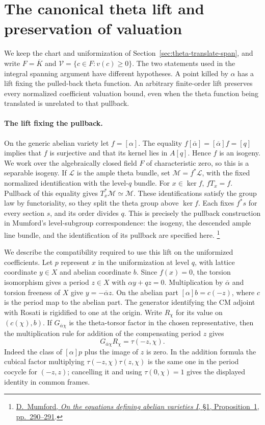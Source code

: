 \section{The canonical theta lift and preservation of valuation}
\label{sec:theta-lift-valuation}

We keep the chart and uniformization of
Section~\ref{sec:theta-translate-span}, and write \(F=\overline K\)
and \(\mathcal V=\{c\in F:v(c)\ge0\}\). The two statements used in the
integral spanning argument have different hypotheses. A point killed
by \(\alpha\) has a lift fixing the pulled-back theta function.
An arbitrary finite-order lift preserves every normalized coefficient
valuation bound, even when the theta function being translated is
unrelated to that pullback.

\paragraph{The lift fixing the pullback.}
On the generic abelian variety let \(f=[\alpha]\). The equality
\(f[\overline\alpha]=[\overline\alpha]f=[q]\) implies that \(f\) is
surjective and that its kernel lies in \(A[q]\). Hence \(f\) is an
isogeny. We work over the algebraically closed field \(F\) of
characteristic zero, so this is a separable isogeny.
If \(\mathcal L\) is the ample theta bundle, set
\(\mathcal M=f^*\mathcal L\), with the fixed normalized identification
with the level-\(q\) bundle. For \(x\in\ker f\), \(fT_x=f\).
Pullback of this equality gives
\(T_x^*\mathcal M\simeq\mathcal M\). These identifications satisfy the
group law by functoriality, so they split the theta group above
\(\ker f\). Each fixes \(f^*s\) for every section \(s\), and its order
divides \(q\). This is precisely the pullback construction in Mumford's
level-subgroup correspondence: the isogeny, the descended ample
line bundle, and the identification of its pullback are specified here.
\footnote{\href{https://pazuki.perso.math.cnrs.fr/index_fichiers/Mumford66.pdf}{D.~Mumford,
\emph{On the equations defining abelian varieties I}, \S1,
Proposition~1, pp.~290--291}.}

We describe the compatibility required to use this lift on the
uniformized coefficients. Let \(p\) represent \(x\) in the
uniformization at level \(q\), with lattice coordinate \(y\in X\)
and abelian coordinate \(b\). Since \(f(x)=0\), the torsion
isomorphism gives a period \(z\in X\) with
\(\alpha y+qz=0\). Multiplication by \(\overline\alpha\) and
torsion freeness of \(X\) give \(y=-\overline\alpha z\).
On the abelian part \([\alpha]b=c(-z)\), where \(c\) is the period
map to the abelian part. The generator identifying the CM adjoint
with Rosati is rigidified to one at the origin. Write \(R_\chi\)
for its value on \((c(\chi),b)\). If \(G_{\overline\alpha\chi}\)
is the theta-torsor factor in the chosen representative, then the
multiplication rule for addition of the compensating period \(z\)
gives
\[
 G_{\overline\alpha\chi}R_\chi=\tau(-z,\chi).
\]
Indeed the class of \([\alpha]p\) plus the image of \(z\) is zero.
In the addition formula the cubical factor multiplying
\(\tau(-z,\chi)\tau(z,\chi)\) is the same one in the period
cocycle for \((-z,z)\); cancelling it and using \(\tau(0,\chi)=1\)
gives the displayed identity in common frames.

